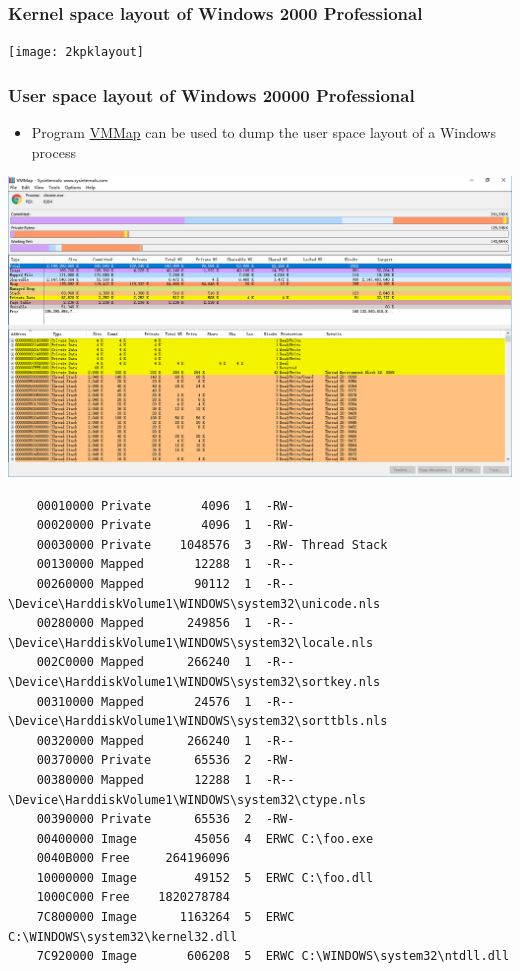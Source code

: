 \documentclass[CJKutf8,dvipsnames,table]{beamer}
\begin{document}
\begin{CJK*}{UTF8}{song}
  \begin{frame}
    \frametitle{Kernel space layout of Windows 2000 Professional} \pause
    \begin{center}
      \texttt{[image: 2kpklayout]}
    \end{center}
  \end{frame}

  \begin{frame}[fragile]
    \frametitle{User space layout of Windows 20000 Professional} \pause
    \begin{itemize}\parskip=0pt
    \item Program \href{https://docs.microsoft.com/en-us/sysinternals/downloads/vmmap}{VMMap} can be used to dump the user space layout of a Windows process  \pause
    \end{itemize}
    \begin{center}
		\includegraphics[scale=0.3]{vmmap}
	\end{center}

\iffalse

    {\tiny
\begin{verbatim}
    00010000 Private       4096  1  -RW-
    00020000 Private       4096  1  -RW-
    00030000 Private    1048576  3  -RW- Thread Stack
    00130000 Mapped       12288  1  -R--
    00260000 Mapped       90112  1  -R-- \Device\HarddiskVolume1\WINDOWS\system32\unicode.nls
    00280000 Mapped      249856  1  -R-- \Device\HarddiskVolume1\WINDOWS\system32\locale.nls
    002C0000 Mapped      266240  1  -R-- \Device\HarddiskVolume1\WINDOWS\system32\sortkey.nls
    00310000 Mapped       24576  1  -R-- \Device\HarddiskVolume1\WINDOWS\system32\sorttbls.nls
    00320000 Mapped      266240  1  -R--
    00370000 Private      65536  2  -RW-
    00380000 Mapped       12288  1  -R-- \Device\HarddiskVolume1\WINDOWS\system32\ctype.nls
    00390000 Private      65536  2  -RW-
    00400000 Image        45056  4  ERWC C:\foo.exe
    0040B000 Free     264196096
    10000000 Image        49152  5  ERWC C:\foo.dll
    1000C000 Free    1820278784
    7C800000 Image      1163264  5  ERWC C:\WINDOWS\system32\kernel32.dll
    7C920000 Image       606208  5  ERWC C:\WINDOWS\system32\ntdll.dll
\end{verbatim}
    }


\end{frame}
\end{CJK*}
\end{document}
